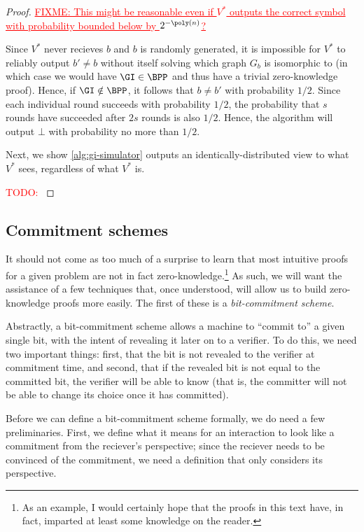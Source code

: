\documentclass[english,12pt]{reedthesis}
\theoremstyle{plain}
\theoremstyle{definition}
\theoremstyle{remark}
\newcommand{\TODO}[1]{\textcolor{red}{TODO: #1}}
\newcommand{\FIXME}[1]{\textcolor{red}{\ul{FIXME: #1}}}
\begin{document}
\begin{proof}
  \FIXME{This might be reasonable even if $V^{*}$ outputs the correct symbol
    with probability bounded below by $2^{-\poly(n)}$?}

  Since $V^{*}$ never recieves $b$ and $b$ is randomly generated, it is
  impossible for $V^{*}$ to reliably output $b' \ne b$ without itself solving
  which graph $G_{b}$ is isomorphic to (in which case we would have $\GI \in \BPP$
  and thus have a trivial zero-knowledge proof). Hence, if $\GI \notin \BPP$, it
  follows that $b \ne b'$ with probability $1/2$. Since each individual round
  succeeds with probability $1/2$, the probability that $s$ rounds have
  succeeded after $2s$ rounds is also $1/2$. Hence, the algorithm will output
  $\bot$ with probability no more than $1/2$.

  Next, we show \cref{alg:gi-simulator} outputs an identically-distributed view
  to what $V^{*}$ sees, regardless of what $V^{*}$ is.

  \TODO{}
\end{proof}

\subsection{Commitment schemes}\label{sec:commitment-scheme}

It should not come as too much of a surprise to learn that most intuitive proofs
for a given problem are not in fact zero-knowledge.\footnote{As an example, I
  would certainly hope that the proofs in this text have, in fact, imparted at
  least some knowledge on the reader.} As such, we will want the assistance of a
few techniques that, once understood, will allow us to build zero-knowledge
proofs more easily. The first of these is a \emph{bit-commitment scheme}.

Abstractly, a bit-commitment scheme allows a machine to ``commit to'' a given
single bit, with the intent of revealing it later on to a verifier. To do this,
we need two important things: first, that the bit is not revealed to the
verifier at commitment time, and second, that if the revealed bit is not equal
to the committed bit, the verifier will be able to know (that is, the committer
will not be able to change its choice once it has committed).

Before we can define a bit-commitment scheme formally, we do need a few
preliminaries. First, we define what it means for an interaction to look like a
commitment from the reciever's perspective; since the reciever needs to be
convinced of the commitment, we need a definition that only considers its
perspective.
\end{document}
